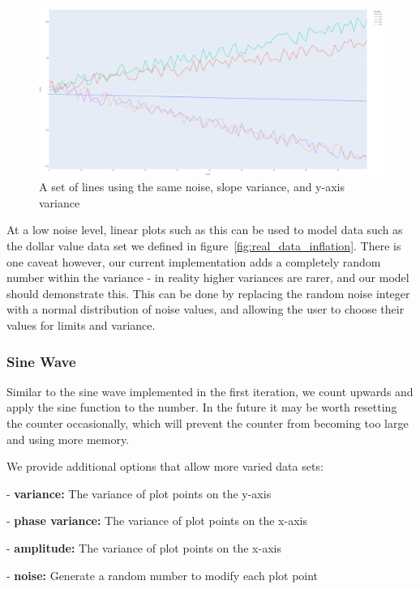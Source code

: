 \begin{figure}[H]
    \centering
    \includegraphics[width=12cm]{figures/data_generation/fake_data_linear_plot}
    \caption{A set of lines using the same noise, slope variance, and y-axis variance}
    \label{fig:datagen_fig_2}
\end{figure}

At a low noise level, linear plots such as this can be used to model data such as the dollar value data set we defined
in figure~\ref{fig:real_data_inflation}.
There is one caveat however, our current implementation adds a completely random number within the variance - in reality
higher variances are rarer, and our model should demonstrate this.
This can be done by replacing the random noise integer with a normal distribution of noise values, and allowing the user
to choose their values for limits and variance.

\subsubsection{Sine Wave}

Similar to the sine wave implemented in the first iteration, we count upwards and apply the sine function to the number.
In the future it may be worth resetting the counter occasionally, which will prevent the counter from becoming too large
and using more memory.

We provide additional options that allow more varied data sets:

- \textbf{variance:} The variance of plot points on the y-axis

- \textbf{phase variance:} The variance of plot points on the x-axis

- \textbf{amplitude:} The variance of plot points on the x-axis

- \textbf{noise:} Generate a random number to modify each plot point


